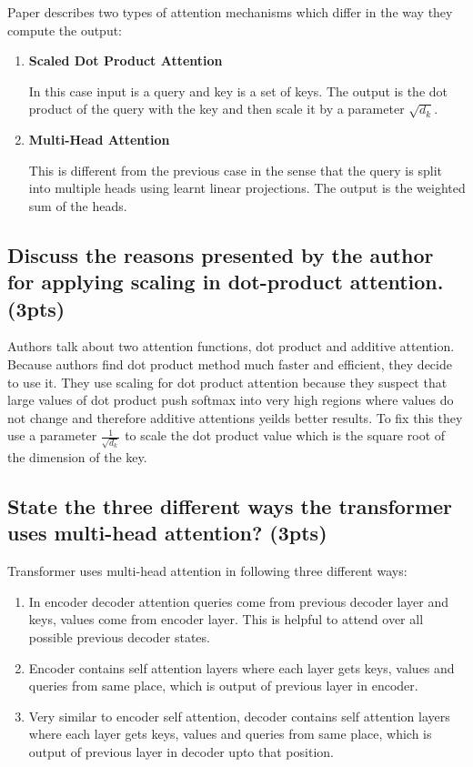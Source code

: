 \documentclass{article}
\begin{document}
Paper describes two types of attention mechanisms which differ in the way they compute the output:
\begin{enumerate}
    \item \textbf{Scaled Dot Product Attention}

        In this case input is a query and key is a set of keys. The output is the dot product of the query with the key and then scale it by a parameter $\sqrt {d_k}$.

    \item \textbf{Multi-Head Attention}

        This is different from the previous case in the sense that the query is split into multiple heads using learnt linear projections. The output is the weighted sum of the heads.
\end{enumerate}


\subsection{Discuss the reasons presented by the author for applying scaling in dot-product attention. (3pts)}

Authors talk about two attention functions, dot product and additive attention. Because authors find dot product method much faster and efficient, they decide to use it. They use scaling for dot product attention because they suspect that large values of dot product push softmax into very high regions where values do not change and therefore additive attentions yeilds better results. To fix this they use a parameter $\frac{1}{\sqrt {d_k}}$ to scale the dot product value which is the square root of the dimension of the key.

\subsection{State the three different ways the transformer uses multi-head attention? (3pts)}

Transformer uses multi-head attention in following three different ways:

\begin{enumerate}
    \item In encoder decoder attention queries come from previous decoder layer and keys, values come from encoder layer. This is helpful to attend over all possible previous decoder states.

    \item Encoder contains self attention layers where each layer gets keys, values and queries from same place, which is output of previous layer in encoder.

    \item Very similar to encoder self attention, decoder contains self attention layers where each layer gets keys, values and queries from same place, which is output of previous layer in decoder upto that position.
\end{enumerate}
\end{document}
